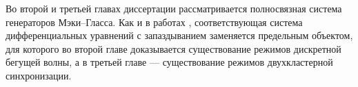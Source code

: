 Во второй и третьей главах диссертации рассматривается полносвязная система генераторов Мэки--Гласса. Как и в работах \cite{Preobrazhenskaya2020, Preobrazhenskaya2021, Preobrazhenskaia2021, Krisztin2020}, соответствующая система дифференциальных уравнений с запаздыванием заменяется предельным объектом, для которого во второй главе доказывается существование режимов дискретной бегущей волны, а в третьей главе --- существование режимов двухкластерной синхронизации.






